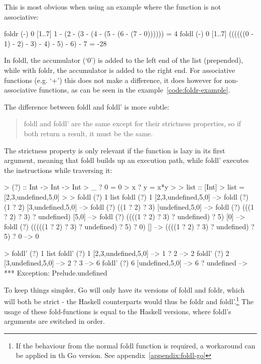 This is most obvious when using an example where the function is not associative:

\begin{code}
    \label{code:foldr-example}
    \begin{haskellcode}
foldr (-) 0 [1..7]
1 - (2 - (3 - (4 - (5 - (6 - (7 - 0)))))) = 4
foldl (-) 0 [1..7]
((((((0 - 1) - 2) - 3) - 4) - 5) - 6) - 7 = -28
    \end{haskellcode}
\end{code}

In foldl, the accumulator (`0') is added to the left end of the list (prepended),
while with foldr, the accumulator is added to the right end.
For associative functions (e.g. `+') this does not make a difference, it does
however for non-associative functions, as can be seen in the example~\ref{code:foldr-example}.

The difference between foldl and foldl' is more subtle:
\begin{quote}
    foldl and foldl' are the same except for their strictness properties, so if both
    return a result, it must be the same.\autocite{fold-types}
\end{quote}

The strictness property is only relevant if the function is lazy in its first argument,
meaning that foldl builds up an execution path, while foldl' executes the instructions
while traversing it:

\begin{code}
    \begin{haskellcode}
> (?) :: Int -> Int -> Int
> _ ? 0 = 0
> x ? y = x*y
>
> list :: [Int]
> list = [2,3,undefined,5,0]
>
> foldl (?) 1 list
foldl (?) 1 [2,3,undefined,5,0] -->
foldl (?) (1 ? 2) [3,undefined,5,0] -->
foldl (?) ((1 ? 2) ? 3) [undefined,5,0] -->
foldl (?) (((1 ? 2) ? 3) ? undefined) [5,0] -->
foldl (?) ((((1 ? 2) ? 3) ? undefined) ? 5) [0] -->
foldl (?) (((((1 ? 2) ? 3) ? undefined) ? 5) ? 0) [] -->
((((1 ? 2) ? 3) ? undefined) ? 5) ? 0 -->
0

> foldl' (?) 1 list
foldl' (?) 1 [2,3,undefined,5,0] -->
    1 ? 2 --> 2
foldl' (?) 2 [3,undefined,5,0] -->
    2 ? 3 --> 6
foldl' (?) 6 [undefined,5,0] -->
    6 ? undefined -->
*** Exception: Prelude.undefined
    \end{haskellcode}
\end{code}

To keep things simpler, Go will only have its versions of foldl and foldr, which
will both be strict - the Haskell counterparts would thus be foldr and foldl'.\footnote{
If the behaviour from the normal foldl function is required, a workaround can
be applied in th Go version. See appendix~\ref{appendix:foldl-go}
}
The usage of these fold-functions is equal to the Haskell versions, where foldl's
arguments are switched in order.

